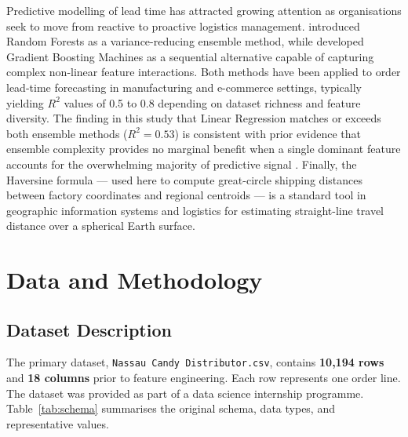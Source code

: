 \documentclass[12pt, a4paper]{article}
\begin{document}
Predictive modelling of lead time has attracted growing attention as organisations
seek to move from reactive to proactive logistics management. \citet{breiman2001}
introduced Random Forests as a variance-reducing ensemble method, while
\citet{friedman2001} developed Gradient Boosting Machines as a sequential
alternative capable of capturing complex non-linear feature interactions. Both
methods have been applied to order lead-time forecasting in manufacturing and
e-commerce settings, typically yielding $R^2$ values of 0.5 to 0.8 depending on
dataset richness and feature diversity. The finding in this study that Linear
Regression matches or exceeds both ensemble methods ($R^2 = 0.53$) is consistent
with prior evidence that ensemble complexity provides no marginal benefit when a
single dominant feature accounts for the overwhelming majority of predictive signal
\citep{breiman2001}. Finally, the Haversine formula \citep{sinnott1984} --- used
here to compute great-circle shipping distances between factory coordinates and
regional centroids --- is a standard tool in geographic information systems and
logistics for estimating straight-line travel distance over a spherical Earth
surface.

\section{Data and Methodology}
\label{sec:data}

\subsection{Dataset Description}

The primary dataset, \texttt{Nassau Candy Distributor.csv}, contains
\textbf{10,194 rows} and \textbf{18 columns} prior to feature engineering.
Each row represents one order line. The dataset was provided as part of a
data science internship programme.
Table~\ref{tab:schema} summarises the original schema, data types, and
representative values.
\end{document}
